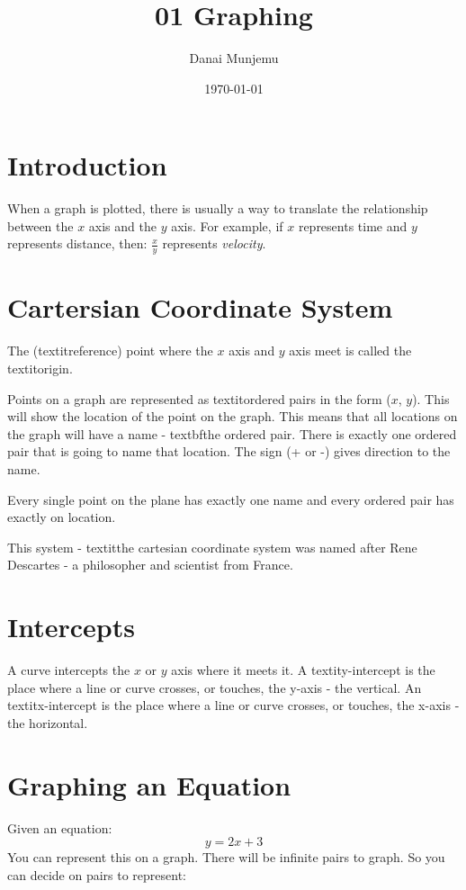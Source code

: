 \documentclass{article}
\title{01 Graphing}
\author{Danai Munjemu}
\date{\today}
\begin{document}
\maketitle %

\section{Introduction}
When a graph is plotted, there is usually a way to translate the relationship between the $x$ axis and the $y$ axis. For example, if $x$ represents time and $y$ represents distance, then:
$\frac{x}{y}$ represents \textit{velocity}.

\section{Cartersian Coordinate System}
The (textit{reference}) point where the $x$ axis and $y$ axis meet is called the textit{origin}.

Points on a graph are represented as textit{ordered pairs} in the form ($x$, $y$). This will show the location of the point on the graph. This means that all locations on the graph will have a name - textbf{the ordered pair}. There is exactly one ordered pair that is going to name that location.
The sign (+ or -) gives direction to the name.

Every single point on the plane has exactly one name and every ordered pair has exactly on location.

This system - textit{the cartesian coordinate system} was named after Rene Descartes - a philosopher and scientist from France.

\section{Intercepts}
A curve intercepts the $x$ or $y$ axis where it meets it. A textit{y-intercept} is the place where a line or curve crosses, or touches, the y-axis - the vertical.  An textit{x-intercept} is the place where a line or curve crosses, or touches, the x-axis - the horizontal.

\section{Graphing an Equation}
Given an equation:
$$y = 2x + 3$$
You can represent this on a graph. There will be infinite pairs to graph. So you can decide on pairs to represent:
\end{document}
